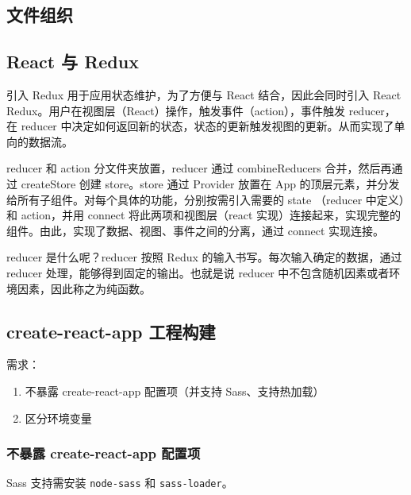 \subsection{文件组织}\label{ux6587ux4ef6ux7ec4ux7ec7}

\subsection{React 与 Redux}\label{react-ux4e0e-redux}

引入 Redux 用于应用状态维护，为了方便与 React 结合，因此会同时引入 React
Redux。用户在视图层（React）操作，触发事件（action），事件触发
reducer，在 reducer
中决定如何返回新的状态，状态的更新触发视图的更新。从而实现了单向的数据流。

reducer 和 action 分文件夹放置，reducer 通过 combineReducers
合并，然后再通过 createStore 创建 store。store 通过 Provider 放置在 App
的顶层元素，并分发给所有子组件。对每个具体的功能，分别按需引入需要的
state （reducer 中定义）和 action，并用 connect 将此两项和视图层（react
实现）连接起来，实现完整的组件。由此，实现了数据、视图、事件之间的分离，通过
connect 实现连接。

reducer 是什么呢？reducer 按照 Redux
的输入书写。每次输入确定的数据，通过 reducer
处理，能够得到固定的输出。也就是说 reducer
中不包含随机因素或者环境因素，因此称之为纯函数。

\subsection{create-react-app
工程构建}\label{create-react-app-ux5de5ux7a0bux6784ux5efa}

需求：

\begin{enumerate}
\def\labelenumi{\arabic{enumi}.}
\tightlist
\item
  不暴露 create-react-app 配置项（并支持 Sass、支持热加载）
\item
  区分环境变量
\end{enumerate}

\subsubsection{不暴露 create-react-app
配置项}\label{ux4e0dux66b4ux9732-create-react-app-ux914dux7f6eux9879}

Sass 支持需安装 \lstinline!node-sass! 和 \lstinline!sass-loader!。

